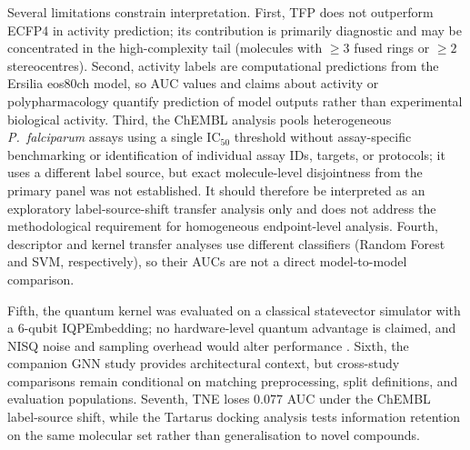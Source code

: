 \documentclass[pdflatex,sn-mathphys-num]{sn-jnl}%
\begin{document}
Several limitations constrain interpretation. First, TFP does not outperform ECFP4 in activity prediction; its contribution is primarily diagnostic and may be concentrated in the high-complexity tail (molecules with $\geq 3$ fused rings or $\geq 2$ stereocentres). Second, activity labels are computational predictions from the Ersilia eos80ch model, so AUC values and claims about activity or polypharmacology quantify prediction of model outputs rather than experimental biological activity. Third, the ChEMBL analysis pools heterogeneous \textit{P.~falciparum} assays using a single IC$_{50}$ threshold without assay-specific benchmarking or identification of individual assay IDs, targets, or protocols; it uses a different label source, but exact molecule-level disjointness from the primary panel was not established. It should therefore be interpreted as an exploratory label-source-shift transfer analysis only and does not address the methodological requirement for homogeneous endpoint-level analysis. Fourth, descriptor and kernel transfer analyses use different classifiers (Random Forest and SVM, respectively), so their AUCs are not a direct model-to-model comparison.

Fifth, the quantum kernel was evaluated on a classical statevector simulator with a 6-qubit IQPEmbedding; no hardware-level quantum advantage is claimed, and NISQ noise and sampling overhead would alter performance \cite{preskill2018nisq}. Sixth, the companion GNN study \cite{saognn2026} provides architectural context, but cross-study comparisons remain conditional on matching preprocessing, split definitions, and evaluation populations. Seventh, TNE loses \num{0.077} AUC under the ChEMBL label-source shift, while the Tartarus docking analysis tests information retention on the same molecular set rather than generalisation to novel compounds.
\end{document}
